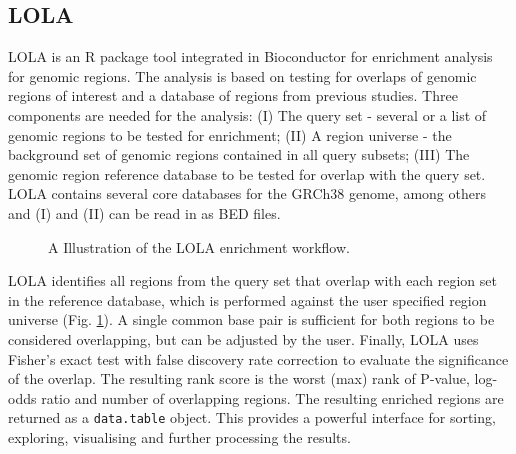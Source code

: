 \documentclass[pdftex,12pt,a4paper]{report}
\begin{document}
\subsection{LOLA}
LOLA is an R package tool integrated in Bioconductor for enrichment analysis for genomic regions\cite{LOLA}. The analysis is based on testing for overlaps of genomic regions of interest and a database of regions from previous studies.
Three components are needed for the analysis: (I) The query set - several or a list of genomic regions to be tested for enrichment; (II) A region universe - the background set of genomic regions contained in all query subsets; (III) The genomic region reference database to be tested for overlap with the query set. LOLA contains several core databases for the GRCh38 genome, among others and (I) and (II) can be read in as BED files.
\begin{figure}[!ht]
\begin{center}
	\caption{A Illustration of the LOLA enrichment workflow\cite{LOLA}.}
	\label{lola}
\end{center}
\end{figure}
LOLA identifies all regions from the query set that overlap with each region set in the reference database, which is performed against the user specified region universe (Fig. \ref{lola}). A single common base pair is sufficient for both regions to be considered overlapping, but can be adjusted by the user. Finally, LOLA uses Fisher's exact test with false discovery rate correction to evaluate the significance of the overlap. The resulting rank score is the worst (max) rank of P-value, log-odds ratio and number of overlapping regions. The resulting enriched regions are returned as a \texttt{data.table} object. This provides a powerful interface for sorting, exploring, visualising and further processing the results.
\end{document}
